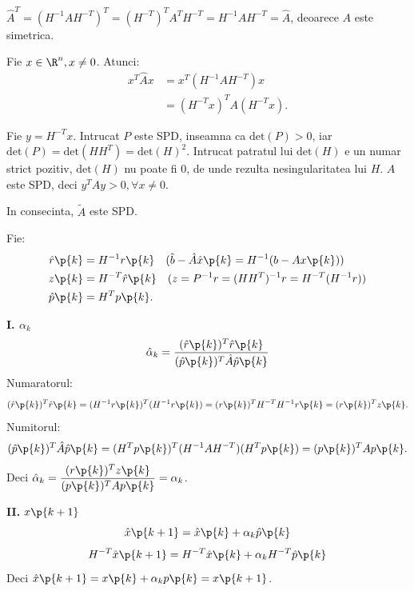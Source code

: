 \begin{demonstratie}

    \medskip


    $ \hat{A}^{T} = (H^{-1} A H^{-T})^{T} = (H^{-T})^{T} A^{T} H^{-T} = H^{-1} A H^{-T} = \hat{A}$, deoarece $ A $ este simetrica.

    Fie $x \in \R^n, x \neq 0$. Atunci:
    \begin{align*}
        x^T \hat{A} x &= x^T (H^{-1} A H^{-T}) x \\
        &= (H^{-T} x)^T A (H^{-T} x).
    \end{align*}

    Fie $y = H^{-T} x$. Intrucat $ P $ este SPD, inseamna ca $\text{det}(P) > 0$, iar $ \text{det}(P) = \text{det}(H H^{T}) = \text{det}(H)^2$. Intrucat patratul lui $ \text{det}(H)$ e un numar strict pozitiv, $ \text{det}(H)$ nu poate fi 0, de unde rezulta nesingularitatea lui $ H $. $ A $ este SPD, deci $y^T A y > 0, \forall x \neq 0$.

    In consecinta,  $ \tilde{A} $ este SPD.

    \bigskip


    Fie:
    \begin{align*}
        \hat{r}\p{k} &= H^{-1} r\p{k} \quad (\hat{b} - \hat{A}\hat{x}\p{k} = H^{-1}(b - Ax\p{k})) \\
        z\p{k} &= H^{-T} \hat{r}\p{k} \quad (z = P^{-1}r = (HH^T)^{-1}r = H^{-T}(H^{-1}r)) \\
        \hat{p}\p{k} &= H^T p\p{k}.
    \end{align*}

    \textbf{I. $\alpha_k$} \\
    $$ \hat{\alpha}_k = \frac{(\hat{r}\p{k})^T \hat{r}\p{k}}{(\hat{p}\p{k})^T \hat{A} \hat{p}\p{k}} $$
    Numaratorul:
    $$ (\hat{r}\p{k})^T \hat{r}\p{k} = (H^{-1}r\p{k})^T (H^{-1}r\p{k}) = (r\p{k})^T H^{-T} H^{-1} r\p{k} = (r\p{k})^T z\p{k}. $$
    Numitorul:
    $$ (\hat{p}\p{k})^T \hat{A} \hat{p}\p{k} = (H^T p\p{k})^T (H^{-1} A H^{-T}) (H^T p\p{k}) = (p\p{k})^T A p\p{k}. $$
    Deci $\displaystyle \hat{\alpha}_k = \frac{(r\p{k})^T z\p{k}}{(p\p{k})^T A p\p{k}} = \alpha_k $.

    \bigskip

    \textbf{II. $x\p{k + 1}$} \\
    $$ \hat{x}\p{k+1} = \hat{x}\p{k} + \alpha_k \hat{p}\p{k} $$
    $$ H^{-T}\hat{x}\p{k+1} = H^{-T}\hat{x}\p{k} + \alpha_k H^{-T}\hat{p}\p{k} $$
    Deci $ \hat{x}\p{k+1} = x\p{k} + \alpha_k p\p{k} = x\p{k + 1}$.


\end{demonstratie}

